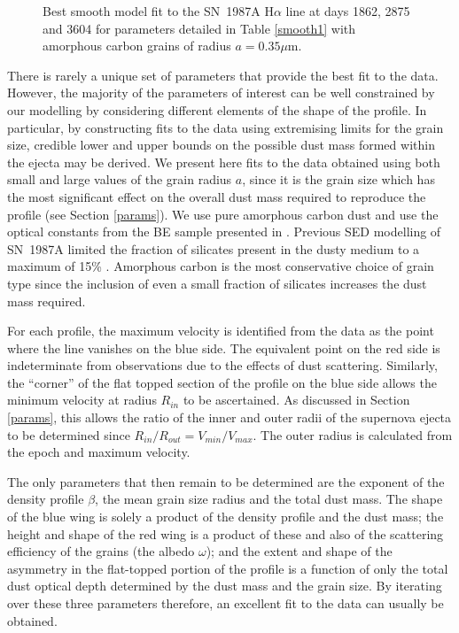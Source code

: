 \documentclass[useAMS,usenatbib,usegraphicx]{mnras}
\begin{document}
\begin{figure}
\begin{center}
\caption{Best smooth model fit to the SN~1987A H$\alpha$ line at days 1862, 2875 and 
3604 for parameters detailed in Table \ref{smooth1} with amorphous carbon grains of radius $a=0.35 \mu$m.}
\label{d1862_3604}
\end{center}
\end{figure}


There is rarely a unique set of parameters that provide the best fit to the data.  However, the 
majority of the parameters of interest can be well constrained by our 
modelling by considering different elements of the shape of the profile.  In particular, by constructing fits to 
the data using extremising limits for the grain 
size, credible lower and upper bounds on the possible dust mass formed 
within the ejecta may be derived.  We present here
 fits to the data obtained using both small and large values of the grain radius $a$, since 
it is the grain size which has the most significant effect on the overall 
dust mass required to reproduce the profile (see Section \ref{params}).  
We use pure amorphous carbon dust and use the optical 
constants from the BE sample presented in \citet{Zubko1996}.  Previous SED
modelling of SN~1987A limited the fraction of silicates present in the dusty 
medium to a maximum of 15\% \citep{Ercolano2007,Wesson2015}. Amorphous 
carbon is the most conservative choice of grain type since the inclusion of even a small 
fraction of silicates increases the dust mass required.

For each profile, the maximum velocity is identified from the data as the 
point where the line vanishes on the blue side.  The equivalent point on 
the red side is indeterminate from observations due to the effects of 
dust scattering.  Similarly, the ``corner'' of the flat topped section of the 
profile on the blue side allows the minimum velocity at radius $R_{in}$ to be 
ascertained. As discussed in Section \ref{params}, this allows the ratio 
of the inner and outer radii of the supernova ejecta to be determined since 
$R_{in}/R_{out}=V_{min}/V_{max}$.  The outer radius is calculated from the 
epoch and maximum velocity.

The only parameters that then remain to be determined are the exponent of 
the density profile $\beta$, the mean grain size radius and the total dust mass.  The shape 
of the blue wing is solely a product of the density profile and the dust 
mass; the height and shape of the red wing is a product of these and also 
of the scattering efficiency of the grains (the albedo $\omega$); and the 
extent and shape of the asymmetry in the flat-topped portion of the 
profile is a function of only the total dust optical depth determined by the 
dust mass and the grain size.  By iterating over these three parameters 
therefore, an excellent fit to the data can usually be obtained.
\end{document}
